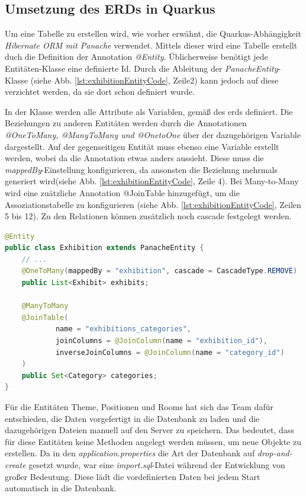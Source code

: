 \subsection{Umsetzung des ERDs in Quarkus}
Um eine Tabelle zu erstellen wird, wie vorher erwähnt, die Quarkus-Abhängigkeit \emph{Hibernate ORM mit Panache} verwendet.
Mittels dieser wird eine Tabelle erstellt duch die Definition der Annotation \emph{@Entity}.
Üblicherweise benötigt jede Entitäten-Klasse eine definierte Id.
Durch die Ableitung der \emph{PanacheEntity}-Klasse (siehe Abb. \ref{lst:exhibitionEntityCode}, Zeile2) kann jedoch auf diese verzichtet werden, da sie dort schon definiert wurde.

In der Klasse werden alle Attribute als Variablen, gemäß des \gls*{erd}s definiert. 
Die Beziehungen zu anderen Entitäten werden durch die Annotationen \emph{@OneToMany, @ManyToMany und @OnetoOne} über der dazugehörigen Variable dargestellt. 
Auf der gegenseitigen Entität muss ebenso eine Variable erstellt werden, wobei da die Annotation etwas anders aussieht. 
Diese muss die \emph{mappedBy}-Einstellung konfigurieren, da ansonsten die Beziehung mehrmals generiert wird(siehe Abb. \ref{lst:exhibitionEntityCode}, Zeile 4). 
Bei Many-to-Many wird eine zuätzliche Annotation @JoinTable hinzugefügt, um die Assoziationstabelle zu konfigurieren (siehe Abb. \ref{lst:exhibitionEntityCode}, Zeilen 5 bis 12). 
Zu den Relationen können zusätzlich noch \gls{cascade} festgelegt werden. 

\begin{lstlisting}[label=lst:exhibitionEntityCode, language=java]
@Entity
public class Exhibition extends PanacheEntity {
    // ...
    @OneToMany(mappedBy = "exhibition", cascade = CascadeType.REMOVE)
    public List<Exhibit> exhibits;

    @ManyToMany
    @JoinTable(
            name = "exhibitions_categories",
            joinColumns = @JoinColumn(name = "exhibition_id"),
            inverseJoinColumns = @JoinColumn(name = "category_id")
    )
    public Set<Category> categories;
}
\end{lstlisting}

Für die Entitäten Theme, Positionen und Rooms hat sich das Team dafür entschieden, die Daten vorgefertigt in die Datenbank zu laden und die dazugehörigen Dateien manuell auf den Server zu speichern. 
Das bedeutet, dass für diese Entitäten keine Methoden angelegt werden müssen, um neue Objekte zu erstellen. 
Da in den \emph{application.properties} die Art der Datenbank auf \emph{drop-and-create} gesetzt wurde, war eine \emph{import.sql}-Datei während der Entwicklung von großer Bedeutung. 
Diese lädt die vordefinierten Daten bei jedem Start automatisch in die Datenbank. 

